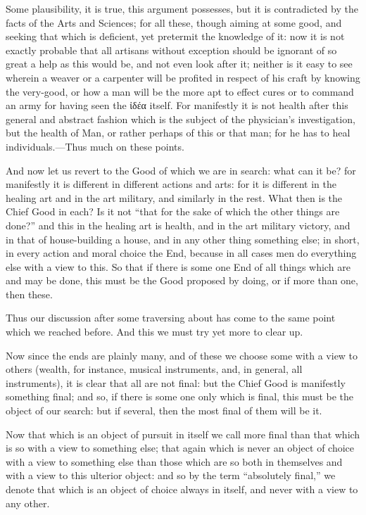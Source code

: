 Some plausibility, it is true, this argument possesses, but it is contradicted
by the facts of the Arts and Sciences; for all these, though aiming at some
good, and seeking that which is deficient, yet pretermit the knowledge of it:
now it is not exactly probable that all artisans without exception should be
ignorant of so great a help as this would be, and not even look after it;
neither is it easy to see wherein a weaver or a carpenter will be profited in
respect of his craft by knowing the very-good, or how a man will be the more
apt to effect cures or to command an army for having seen the
ἰδέα itself. For manifestly it is not health after this
general and abstract fashion which is the subject of the physician’s
investigation, but the health of Man, or rather perhaps of this or that man;
for he has to heal individuals.—Thus much on these points.


And now let us revert to the Good of which we are in search: what can it be?
for manifestly it is different in different actions and arts: for it is
different in the healing art and in the art military, and similarly in the
rest. What then is the Chief Good in each? Is it not “that for the sake
of which the other things are done?” and this in the healing art is
health, and in the art military victory, and in that of house-building a house,
and in any other thing something else; in short, in every action and moral
choice the End, because in all cases men do everything else with a view to
this. So that if there is some one End of all things which are and may be done,
this must be the Good proposed by doing, or if more than one, then these.

Thus our discussion after some traversing about has come to the same point
which we reached before. And this we must try yet more to clear up.

Now since the ends are plainly many, and of these we choose some with a view to
others (wealth, for instance, musical instruments, and, in general, all
instruments), it is clear that all are not final: but the Chief Good is
manifestly something final; and so, if there is some one only which is final,
this must be the object of our search: but if several, then the most final of
them will be it.

Now that which is an object of pursuit in itself we call more final than that
which is so with a view to something else; that again which is never an object
of choice with a view to something else than those which are so both in
themselves and with a view to this ulterior object: and so by the term
“absolutely final,” we denote that which is an object of choice
always in itself, and never with a view to any other.

